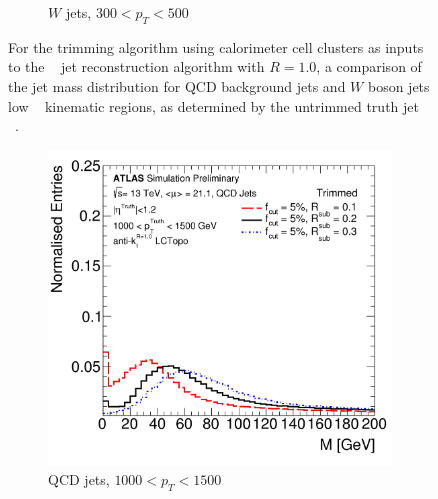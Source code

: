 \begin{figure}[htbp!]
\begin{subfigure}[b]{0.4\textwidth}
        \caption{$W$ jets, $300 < p_{T} < 500$ \GeV}
        \label{fig:obj_trim_w_lowpt}
    \end{subfigure} 
   \caption{
   For the trimming algorithm using calorimeter cell clusters as inputs to the \akt~ jet reconstruction algorithm with $R = 1.0$, a comparison of the jet mass distribution for QCD background jets and $W$ boson jets low \pt~ kinematic regions, as determined by the untrimmed truth jet \pt~.}
  \label{fig:obj_trim_lowpt}
\end{figure}


\begin{figure}[htbp!]
  \centering
  \captionsetup{justification=centering}
    \begin{subfigure}[b]{0.4\textwidth}
        \includegraphics[width=\textwidth]{figures/object/trim_qcd_highpt}
        \caption{QCD jets, $1000 < p_{T} < 1500$ \GeV}
        \label{fig:obj_trim_qcd_highpt}
    \end{subfigure}
    \quad \quad 
    \begin{subfigure}[b]{0.4\textwidth}

\end{subfigure}
\end{figure}
